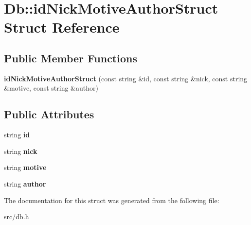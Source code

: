\hypertarget{struct_db_1_1id_nick_motive_author_struct}{
\section{Db::idNickMotiveAuthorStruct Struct Reference}
\label{struct_db_1_1id_nick_motive_author_struct}
}
\subsection*{Public Member Functions}
\begin{DoxyCompactItemize}
\item 
\hypertarget{struct_db_1_1id_nick_motive_author_struct_a3281390f30f127afc4dc723a4e68bb2e}{
{\bfseries idNickMotiveAuthorStruct} (const string \&id, const string \&nick, const string \&motive, const string \&author)}
\label{struct_db_1_1id_nick_motive_author_struct_a3281390f30f127afc4dc723a4e68bb2e}

\end{DoxyCompactItemize}
\subsection*{Public Attributes}
\begin{DoxyCompactItemize}
\item 
\hypertarget{struct_db_1_1id_nick_motive_author_struct_ae7117fbb51f69f70b9dcbe9db477c91b}{
string {\bfseries id}}
\label{struct_db_1_1id_nick_motive_author_struct_ae7117fbb51f69f70b9dcbe9db477c91b}

\item 
\hypertarget{struct_db_1_1id_nick_motive_author_struct_aaee722317f06027eaa55bc144309e781}{
string {\bfseries nick}}
\label{struct_db_1_1id_nick_motive_author_struct_aaee722317f06027eaa55bc144309e781}

\item 
\hypertarget{struct_db_1_1id_nick_motive_author_struct_a94f656df6280870cfb4524860f0e2506}{
string {\bfseries motive}}
\label{struct_db_1_1id_nick_motive_author_struct_a94f656df6280870cfb4524860f0e2506}

\item 
\hypertarget{struct_db_1_1id_nick_motive_author_struct_a89da4120da1ec41e559dccd67ad56afb}{
string {\bfseries author}}
\label{struct_db_1_1id_nick_motive_author_struct_a89da4120da1ec41e559dccd67ad56afb}

\end{DoxyCompactItemize}


The documentation for this struct was generated from the following file:\begin{DoxyCompactItemize}
\item 
src/db.h\end{DoxyCompactItemize}
